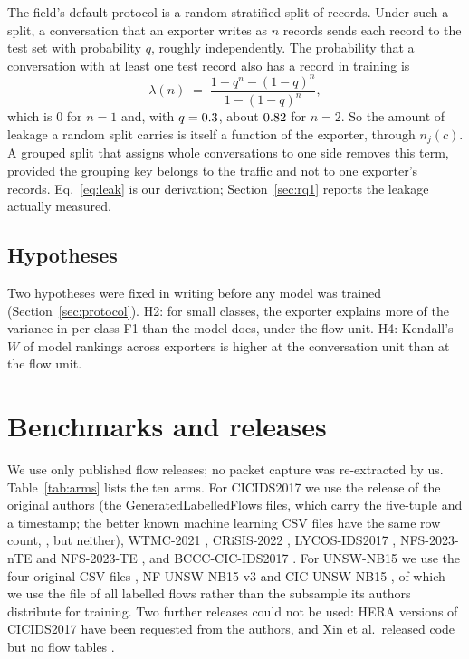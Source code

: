 \documentclass[pdflatex,sn-mathphys-num]{sn-jnl}
\newcommand{\cicids}{CICIDS2017}
\theoremstyle{thmstyleone}%
\theoremstyle{thmstylethree}%
\begin{document}
The field's default protocol is a random stratified split of records. Under such a split, a conversation that an exporter writes as $n$ records sends each record to the test set with probability $q$, roughly independently. The probability that a conversation with at least one test record also has a record in training is
\begin{equation}\label{eq:leak}
\lambda(n) \;=\; \frac{1 - q^{n} - (1-q)^{n}}{1 - (1-q)^{n}},
\end{equation}
which is $0$ for $n = 1$ and, with $q = 0.3$, about $0.82$ for $n = 2$. So the amount of leakage a random split carries is itself a function of the exporter, through $n_j(c)$. A grouped split that assigns whole conversations to one side removes this term, provided the grouping key belongs to the traffic and not to one exporter's records. Eq.~\eqref{eq:leak} is our derivation; Section~\ref{sec:rq1} reports the leakage actually measured.

\subsection{Hypotheses}

Two hypotheses were fixed in writing before any model was trained (Section~\ref{sec:protocol}). H2: for small classes, the exporter explains more of the variance in per-class F1 than the model does, under the flow unit. H4: Kendall's $W$ of model rankings across exporters is higher at the conversation unit than at the flow unit.

\section{Benchmarks and releases}\label{sec:data}

We use only published flow releases; no packet capture was re-extracted by us. Table~\ref{tab:arms} lists the ten arms. For \cicids{} we use the release of the original authors (the GeneratedLabelledFlows files, which carry the five-tuple and a timestamp; the better known machine learning CSV files have the same row count, \NcicRows{}, but neither), WTMC-2021 \cite{engelen2021}, CRiSIS-2022 \cite{lanvin2023}, LYCOS-IDS2017 \cite{rosay2021}, NFS-2023-nTE and NFS-2023-TE \cite{pekar2024}, and BCCC-CIC-IDS2017 \cite{shafi2024}. For UNSW-NB15 we use the four original CSV files \cite{moustafa2015}, NF-UNSW-NB15-v3 \cite{luay2026} and CIC-UNSW-NB15 \cite{mohammadian2024}, of which we use the file of all labelled flows rather than the subsample its authors distribute for training. Two further releases could not be used: HERA versions of \cicids{} \cite{pinto2025} have been requested from the authors, and Xin et al.\ released code but no flow tables \cite{xin2026}.
\end{document}
